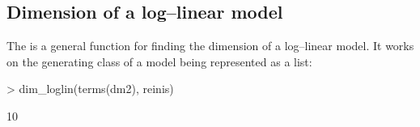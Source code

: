 \documentclass[12pt]{article}
\begin{document}

















\subsection{Dimension of a log--linear model}
\label{sec:dimloglin}

The  is a general function for finding the dimension
of a log--linear model. It works on the generating class of a model
being represented as a list:

\begin{Schunk}
\begin{Sinput}
> dim_loglin(terms(dm2), reinis)
\end{Sinput}
\begin{Soutput}
[1] 10
\end{Soutput}
\end{Schunk}
\end{document}
